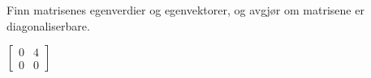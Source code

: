\begin{oppgave}
Finn matrisenes egenverdier og egenvektorer, og avgjør om matrisene er diagonaliserbare. 
\begin{punkt}
$\begin{bmatrix}
0 & 4\\
0 & 0
\end{bmatrix}$
\end{punkt}
%
%
%
%

%
%
%
%
%


%
%
%
%
%
%
%
%
%



\end{oppgave}
